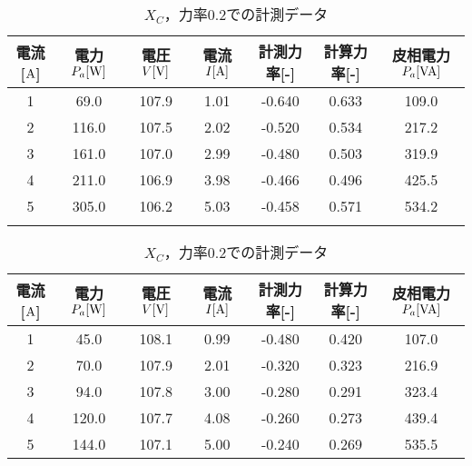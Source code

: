 \begin{itemize}
\begin{table}[h]
	\caption{$X_{C}$，力率$0.4$での計測データ}
	\label{tab:0.4data2}
\begin{tabular}{ccccccc}
	\hline
	電流[$\rm{A}$] & 電力$P_a[\rm{W}]$ & 電圧$V[\rm{V}]$ & 電流$I[\rm{A}]$ & 計測力率[-] & 計算力率[-] & 皮相電力$P_a[\rm{VA}]$ \\ \hline
	1 & 69.0  & 107.9 & 1.01 & -0.640 & 0.633 & 109.0 \\
	2 & 116.0 & 107.5 & 2.02 & -0.520 & 0.534 & 217.2 \\
	3 & 161.0 & 107.0 & 2.99 & -0.480 & 0.503 & 319.9 \\
	4 & 211.0 & 106.9 & 3.98 & -0.466 & 0.496 & 425.5 \\
	5 & 305.0 & 106.2 & 5.03 & -0.458 & 0.571 & 534.2 \\ \hline\\
\end{tabular}
	\caption{$X_{C}$，力率$0.2$での計測データ}
	\label{tab:0.2data2}
\begin{tabular}{ccccccc}
\hline
電流[$\rm{A}$] & 電力$P_a[\rm{W}]$ & 電圧$V[\rm{V}]$ & 電流$I[\rm{A}]$ & 計測力率[-] & 計算力率[-] & 皮相電力$P_a[\rm{VA}]$ \\ \hline
1 & 45.0  & 108.1 & 0.99 & -0.480 & 0.420 & 107.0 \\
2 & 70.0  & 107.9 & 2.01 & -0.320 & 0.323 & 216.9 \\
3 & 94.0  & 107.8 & 3.00 & -0.280 & 0.291 & 323.4 \\
4 & 120.0 & 107.7 & 4.08 & -0.260 & 0.273 & 439.4 \\
5 & 144.0 & 107.1 & 5.00 & -0.240 & 0.269 & 535.5 \\ \hline
\end{tabular}
\end{table}
\end{itemize}